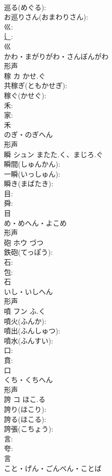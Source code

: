 \documentclass[8pt]{extreport}
\begin{document}
\begin{CJK}{UTF8}{min}
\\	巡る(めぐる): 
\\	お巡りさん(おまわりさん): 
\\	巛: 
\\	辶: 
\\	巛	
\\	かわ・まがりがわ・さんぼんがわ	
\\	形声 
\\	稼	カ	かせ.ぐ		
\\	共稼ぎ(ともかせぎ): 
\\	稼ぐ(かせぐ): 
\\	禾: 
\\	家: 
\\	禾	
\\	のぎ・のぎへん	
\\	形声 
\\	瞬	シュン	またた.く、まじろ.ぐ		
\\	瞬間(しゅんかん): 
\\	一瞬(いっしゅん): 
\\	瞬き(まばたき): 
\\	目: 
\\	舜: 
\\	目	
\\	め・めへん・よこめ	
\\	形声 
\\	砲	ホウ		づつ	
\\	鉄砲(てっぽう): 
\\	石: 
\\	包: 
\\	石	
\\	いし・いしへん	
\\	形声 
\\	噴	フン	ふ.く		
\\	噴火(ふんか): 
\\	噴出(ふんしゅつ): 
\\	噴水(ふんすい): 
\\	口: 
\\	賁: 
\\	口	
\\	くち・くちへん	
\\	形声 
\\	誇	コ	ほこ.る		
\\	誇り(ほこり): 
\\	誇る(ほこる): 
\\	誇張(こちょう): 
\\	言: 
\\	夸: 
\\	言	
\\	こと・げん・ごんべん・ことば	

\end{CJK}
\end{document}
